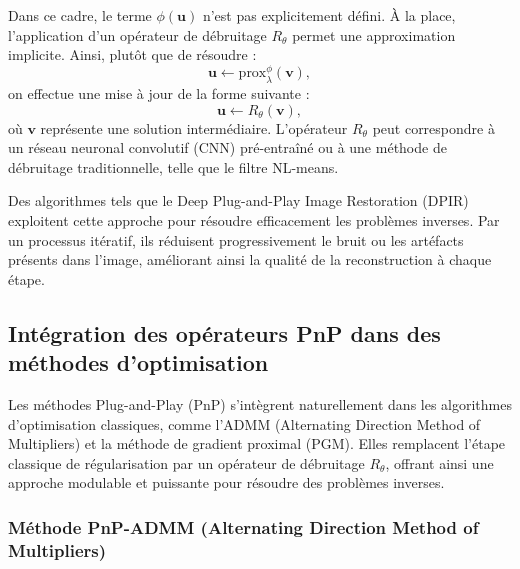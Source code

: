 \documentclass[a4paper, 12pt]{report} %
\begin{document}
Dans ce cadre, le terme \( \phi(\mathbf{u}) \) n'est pas explicitement défini. À la place, l'application d'un opérateur de débruitage \( R_\theta \) permet une approximation implicite. Ainsi, plutôt que de résoudre :
\[
\mathbf{u} \leftarrow \text{prox}_{\lambda}^{\phi}(\mathbf{v}),
\]
on effectue une mise à jour de la forme suivante :
\[
\mathbf{u} \leftarrow R_\theta(\mathbf{v}), 
\]
où \( \mathbf{v} \) représente une solution intermédiaire. L’opérateur \( R_\theta \) peut correspondre à un réseau neuronal convolutif (CNN) pré-entraîné ou à une méthode de débruitage traditionnelle, telle que le filtre NL-means.

Des algorithmes tels que le Deep Plug-and-Play Image Restoration (DPIR) exploitent cette approche pour résoudre efficacement les problèmes inverses. Par un processus itératif, ils réduisent progressivement le bruit ou les artéfacts présents dans l’image, améliorant ainsi la qualité de la reconstruction à chaque étape.

\subsection{Intégration des opérateurs PnP dans des méthodes d’optimisation}

Les méthodes Plug-and-Play (PnP) s’intègrent naturellement dans les algorithmes d’optimisation classiques, comme l’ADMM (Alternating Direction Method of Multipliers) et la méthode de gradient proximal (PGM). Elles remplacent l’étape classique de régularisation par un opérateur de débruitage \( R_\theta \), offrant ainsi une approche modulable et puissante pour résoudre des problèmes inverses.

\subsubsection{Méthode PnP-ADMM (Alternating Direction Method of Multipliers)}
\end{document}
